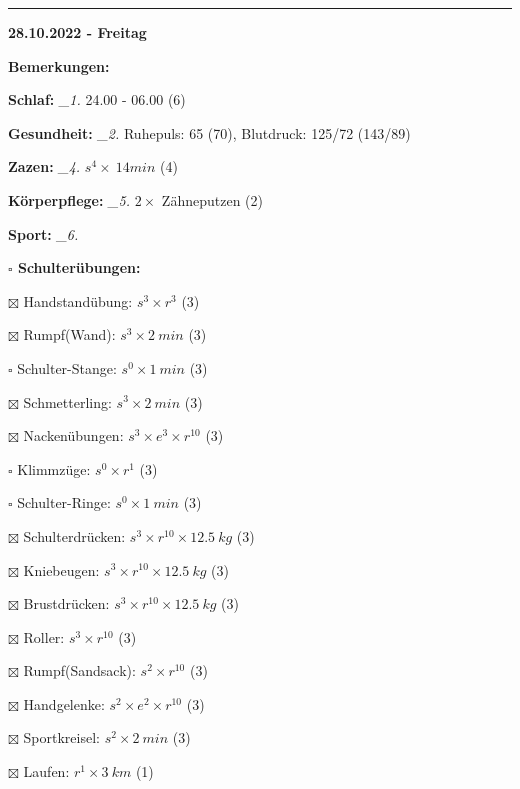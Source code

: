 \documentclass[10pt,a4paper]{article}
\newcommand\prop[1] {{\color {alizarin} {\bf #1}}}             %
\newcommand\rele[1] {{\color {english} \bf {#1}}}              %
\newcommand\mand[1] {{\color {burntorange} {\bf #1}}}          %
\newcommand\ddivide {\vskip -9pt \hrule \vskip 6pt}
\newcommand\topspace{\vskip -15pt \hskip 20pt}
\newcommand\n[1] { {\sl #1.} \hskip 5pt }
\begin{document}
\ddivide
{\rele {28.10.2022 - Freitag}}

\begin{mdframed}[style=daystyle]
  \begin{labeling}{{\mand {Bemerkungen:}}}
    \setlength\itemsep{-3pt}
  \item[{\mand {Schlaf:}}]        \n{\_1} 24.00 - 06.00 (6)
  \item[{\mand {Gesundheit:}}]    \n{\_2} Ruhepuls: 65 (70), Blutdruck: 125/72 (143/89)
  \item[{\mand {Zazen:}}]         \n{\_4} $s^4 \times\ 14 min$ (4)
  \item[{\mand {Körperpflege:}}]  \n{\_5} $2 \times$ Zähneputzen (2)
  \item[{\mand {Sport:}}]         \n{\_6}
    \topspace
    \begin{minipage}{0.75\textwidth}  
      \begin{labeling}{\prop {$\square$ {Schulterübungen:}}} 
        \setlength\itemsep{-3pt}
      \item[$\boxtimes$ Handstandübung:]  $s^3 \times r^{3}$ (3)
      \item[$\boxtimes$ Rumpf(Wand):]     $s^3 \times 2\ min$ (3)
      \item[$\square$ Schulter-Stange:] $s^0 \times 1\ min$ (3)
      \item[$\boxtimes$ Schmetterling:]   $s^3 \times 2\ min$ (3)
      \item[$\boxtimes$ Nackenübungen:]   $s^3 \times e^3 \times r^{10}$ (3)
      \item[$\square$ Klimmzüge:]       $s^0 \times r^1$ (3)
      \item[$\square$ Schulter-Ringe:]  $s^0 \times 1\ min$ (3)
      \item[$\boxtimes$ Schulterdrücken:] $s^3 \times r^{10} \times 12.5\ kg$ (3)
      \item[$\boxtimes$ Kniebeugen:]      $s^3 \times r^{10} \times 12.5\ kg$ (3)
      \item[$\boxtimes$ Brustdrücken:]    $s^3 \times r^{10} \times 12.5\ kg$ (3)
      \item[$\boxtimes$ Roller:]          $s^3 \times r^{10}$ (3)
      \item[$\boxtimes$ Rumpf(Sandsack):] $s^2 \times r^{10}$ (3)
      \item[$\boxtimes$ Handgelenke:]     $s^2 \times e^2 \times r^{10}$ (3)
      \item[$\boxtimes$ Sportkreisel:]    $s^2 \times 2\ min$ (3)
      \item[$\boxtimes$ Laufen:]          $r^1 \times 3\ km$ (1)

\end{labeling}
\end{minipage}
\end{labeling}
\end{mdframed}
\end{document}
